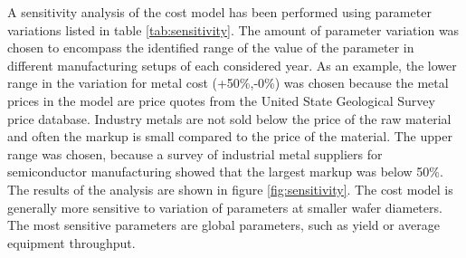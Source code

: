 \documentclass[10pt]{article}
\begin{document}
A sensitivity analysis of the cost model has been performed using parameter variations listed in table \ref{tab:sensitivity}. The amount of parameter variation was chosen to encompass the identified range of the value of the parameter in different manufacturing setups of each considered year. As an example, the lower range in the variation for metal cost (+50\%,-0\%) was chosen because the metal prices in the model are price quotes from the United State Geological Survey price database. Industry metals are not sold below the price of the raw material and often the markup is small compared to the price of the material. The upper range was chosen, because a survey of industrial metal suppliers for semiconductor manufacturing showed that the largest markup was below 50\%. The results of the analysis are shown in figure \ref{fig:sensitivity}. The cost model is generally more sensitive to variation of parameters at smaller wafer diameters. The most sensitive parameters are global parameters, such as yield or average equipment throughput.
\end{document}
